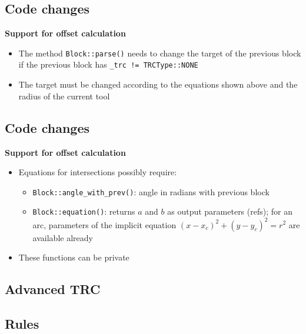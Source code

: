 \documentclass[
  letterpaper,
  DIV=11,
  numbers=noendperiod]{scrartcl}
\providecommand{\tightlist}{%
  \setlength{\itemsep}{0pt}\setlength{\parskip}{0pt}}
\begin{document}
\subsection{Code changes}\label{code-changes-2}

\textbf{Support for offset calculation}

\begin{itemize}
\tightlist
\item
  The method \texttt{Block::parse()} needs to change the target of the
  previous block if the previous block has
  \texttt{\_trc\ !=\ TRCType::NONE}
\item
  The target must be changed according to the equations shown above and
  the radius of the current tool
\end{itemize}

\subsection{Code changes}\label{code-changes-3}

\textbf{Support for offset calculation}

\begin{itemize}
\tightlist
\item
  Equations for intersections possibly require:

  \begin{itemize}
  \tightlist
  \item
    \texttt{Block::angle\_with\_prev()}: angle in radians with previous
    block
  \item
    \texttt{Block::equation()}: returns \(a\) and \(b\) as output
    parameters (refs); for an arc, parameters of the implicit equation
    \((x - x_c)^2 + (y - y_c)^2 = r^2\) are available already
  \end{itemize}
\item
  These functions can be private
\end{itemize}

\subsection{Advanced TRC}\label{advanced-trc}

\subsection{Rules}\label{rules}
\end{document}
